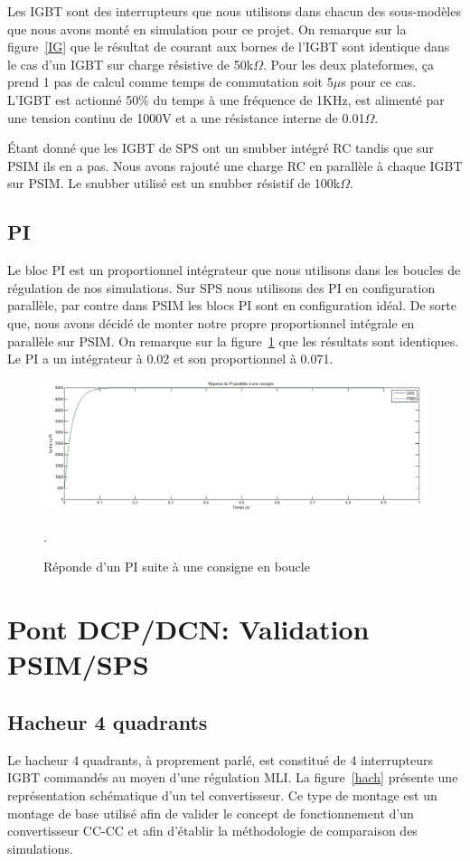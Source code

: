 \documentclass[11pt,letterpaper,final]{report}
\begin{document}
Les IGBT sont des interrupteurs que nous utilisons dans chacun des sous-modèles que nous avons monté en simulation pour ce projet. On remarque sur la figure~\ref{IG} que le résultat de courant aux bornes de l'IGBT sont identique dans le cas d'un IGBT sur charge résistive de 50k$\Omega$. Pour les deux plateformes, ça prend 1 pas de calcul comme temps de commutation soit 5$\mu$s pour ce cas. L'IGBT est actionné 50\% du temps à une fréquence de 1KHz, est alimenté par une tension continu de 1000V et a une résistance interne de 0.01$\Omega$. 

Étant donné que les IGBT de SPS ont un snubber intégré RC tandis que sur PSIM ils en a pas. Nous avons rajouté une charge RC en parallèle à chaque IGBT sur PSIM. Le snubber utilisé est un snubber résistif de 100k$\Omega$.
 
\subsection{PI}
Le bloc PI est un proportionnel intégrateur que nous utilisons dans les boucles de régulation de nos simulations. Sur SPS nous utilisons des PI en configuration parallèle, par contre dans PSIM les blocs PI sont en configuration idéal. De sorte que, nous avons décidé de monter notre propre proportionnel intégrale en parallèle sur PSIM. On remarque sur la figure~\ref{PI} que les résultats sont identiques. Le PI a un intégrateur à 0.02 et son proportionnel à 0.071. 

\begin{figure}[htb]
\centering
\includegraphics[scale=0.5]{Fig/Comp/PI.jpg}
\caption{Réponde d'un PI suite à une consigne en boucle}.
\label{PI}
\end{figure}



\section{Pont DCP/DCN: Validation PSIM/SPS}
\subsection{Hacheur 4 quadrants}
Le hacheur 4 quadrants, à proprement parlé, est constitué de 4 interrupteurs IGBT commandés au moyen d'une régulation MLI. La figure~\ref{hach} présente une représentation schématique d'un tel convertisseur. Ce type de montage est un montage de base utilisé afin de valider le concept de fonctionnement d'un convertisseur CC-CC et afin d'établir la méthodologie de comparaison des simulations.
\end{document}
